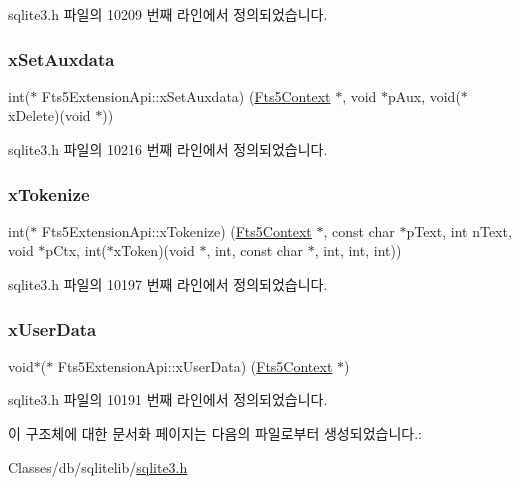 sqlite3.\+h 파일의 10209 번째 라인에서 정의되었습니다.

\mbox{\label{struct_fts5_extension_api_a0f59a6c383a478ed95efdb7e4a95de80}} 
\subsubsection{\texorpdfstring{x\+Set\+Auxdata}{xSetAuxdata}}
{\footnotesize\ttfamily int($\ast$ Fts5\+Extension\+Api\+::x\+Set\+Auxdata) (\hyperlink{sqlite3_8h_a97821b95ebebd43db901977ffd5b26bc}{Fts5\+Context} $\ast$, void $\ast$p\+Aux, void($\ast$x\+Delete)(void $\ast$))}



sqlite3.\+h 파일의 10216 번째 라인에서 정의되었습니다.

\mbox{\label{struct_fts5_extension_api_a670af0d7715f69834376f8df187dcf30}} 
\subsubsection{\texorpdfstring{x\+Tokenize}{xTokenize}}
{\footnotesize\ttfamily int($\ast$ Fts5\+Extension\+Api\+::x\+Tokenize) (\hyperlink{sqlite3_8h_a97821b95ebebd43db901977ffd5b26bc}{Fts5\+Context} $\ast$, const char $\ast$p\+Text, int n\+Text, void $\ast$p\+Ctx, int($\ast$x\+Token)(void $\ast$, int, const char $\ast$, int, int, int))}



sqlite3.\+h 파일의 10197 번째 라인에서 정의되었습니다.

\mbox{\label{struct_fts5_extension_api_a8e651288d8e0cf25f20f2b838f47ac34}} 
\subsubsection{\texorpdfstring{x\+User\+Data}{xUserData}}
{\footnotesize\ttfamily void$\ast$($\ast$ Fts5\+Extension\+Api\+::x\+User\+Data) (\hyperlink{sqlite3_8h_a97821b95ebebd43db901977ffd5b26bc}{Fts5\+Context} $\ast$)}



sqlite3.\+h 파일의 10191 번째 라인에서 정의되었습니다.



이 구조체에 대한 문서화 페이지는 다음의 파일로부터 생성되었습니다.\+:\begin{DoxyCompactItemize}
\item 
Classes/db/sqlitelib/\hyperlink{sqlite3_8h}{sqlite3.\+h}\end{DoxyCompactItemize}
